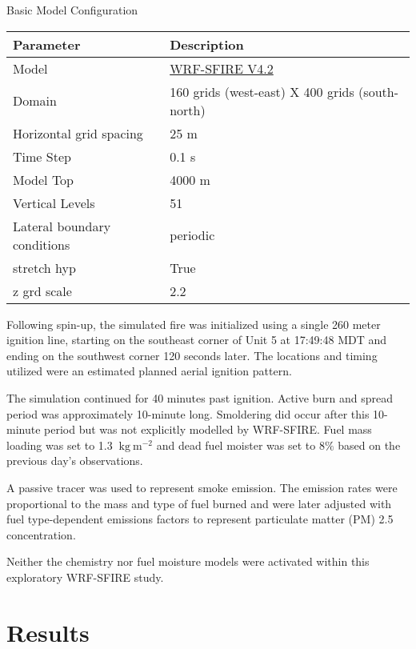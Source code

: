 \documentclass[preprints,article,accept,moreauthors,pdftex]{Definitions/mdpi}
\begin{document}
\begin{specialtable}[H]
  \centering
  \caption{Basic Model Configuration\label{tab1}}
  \begin{tabular}{ll}
  \toprule
  \textbf{Parameter}	& \textbf{Description}\\
  \midrule
   Model		& \href{https://github.com/openwfm/WRF-SFIRE/tree/a2c3118f08ce424885705e9155b127ea28879f8b}{WRF-SFIRE V4.2}\\
   Domain		& 160 grids (west-east) X 400 grids (south-north)\\
   Horizontal grid spacing		& 25 m\\
   Time Step	& 0.1 s\\
   Model Top		& 4000 m\\
   Vertical Levels		& 51\\
   Lateral boundary conditions	& periodic\\
   stretch hyp & True\\
   z grd scale & 2.2\\
  \bottomrule
  \end{tabular}
  \end{specialtable}

Following spin-up, the simulated fire was initialized using a single 260 meter ignition line, starting on the southeast corner of Unit 5 at 17:49:48 MDT and ending on the southwest corner 120 seconds later. The locations and timing utilized were an estimated planned aerial ignition pattern.

The simulation continued for 40 minutes past ignition. Active burn and spread period was approximately 10-minute long. Smoldering did occur after this 10-minute period but was not explicitly modelled by WRF-SFIRE. Fuel mass loading was set to 1.3 $\mathrm{~kg}\mathrm{~m}^{-2}$ and dead fuel moister was set to 8$\%$ based on the previous day’s observations.

A passive tracer was used to represent smoke emission. The emission rates were proportional to the mass and type of fuel burned and were later adjusted with fuel type-dependent emissions factors to represent particulate matter (PM) 2.5 concentration.

Neither the chemistry nor fuel moisture models were activated within this exploratory WRF-SFIRE study.
\section{Results}
\end{document}
